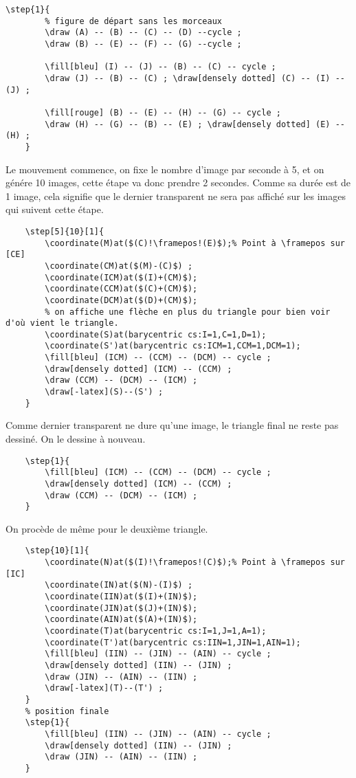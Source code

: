 \documentclass[a4paper,12pt]{article}
\begin{document}
\begin{lstlisting}[name=exemplecomplet]
	\step{1}{
		% figure de départ sans les morceaux
		\draw (A) -- (B) -- (C) -- (D) --cycle ;
		\draw (B) -- (E) -- (F) -- (G) --cycle ;
		
		\fill[bleu] (I) -- (J) -- (B) -- (C) -- cycle ;
		\draw (J) -- (B) -- (C) ; \draw[densely dotted] (C) -- (I) -- (J) ;
			
		\fill[rouge] (B) -- (E) -- (H) -- (G) -- cycle ;
		\draw (H) -- (G) -- (B) -- (E) ; \draw[densely dotted] (E) -- (H) ;
	}
\end{lstlisting}
Le mouvement commence, on fixe le nombre d'image par seconde à 5, et on génére 10 images, cette étape va donc prendre 2 secondes. Comme sa durée est de 1 image, cela signifie 
que le dernier transparent ne sera pas affiché sur les images qui suivent cette étape.
\begin{lstlisting}[name=exemplecomplet]
	% déplacement du premier triangle
	\step[5]{10}[1]{
		\coordinate(M)at($(C)!\framepos!(E)$);% Point à \framepos sur [CE]
		\coordinate(CM)at($(M)-(C)$) ;
		\coordinate(ICM)at($(I)+(CM)$);
		\coordinate(CCM)at($(C)+(CM)$);
		\coordinate(DCM)at($(D)+(CM)$);
		% on affiche une flèche en plus du triangle pour bien voir d'où vient le triangle.
		\coordinate(S)at(barycentric cs:I=1,C=1,D=1);
		\coordinate(S')at(barycentric cs:ICM=1,CCM=1,DCM=1);
		\fill[bleu] (ICM) -- (CCM) -- (DCM) -- cycle ;
		\draw[densely dotted] (ICM) -- (CCM) ;
		\draw (CCM) -- (DCM) -- (ICM) ;
		\draw[-latex](S)--(S') ;
	}
\end{lstlisting}

Comme dernier transparent ne dure qu'une image, le triangle final ne reste pas dessiné. On le dessine à nouveau.

\begin{lstlisting}[name=exemplecomplet]
	% position finale
	\step{1}{
		\fill[bleu] (ICM) -- (CCM) -- (DCM) -- cycle ;
		\draw[densely dotted] (ICM) -- (CCM) ;
		\draw (CCM) -- (DCM) -- (ICM) ;
	}
\end{lstlisting}

On procède de même pour le deuxième triangle.

\begin{lstlisting}[name=exemplecomplet]
	% déplacement du deuxième triangle
	\step{10}[1]{
		\coordinate(N)at($(I)!\framepos!(C)$);% Point à \framepos sur [IC]
		\coordinate(IN)at($(N)-(I)$) ;
		\coordinate(IIN)at($(I)+(IN)$);
		\coordinate(JIN)at($(J)+(IN)$);
		\coordinate(AIN)at($(A)+(IN)$);
		\coordinate(T)at(barycentric cs:I=1,J=1,A=1);
		\coordinate(T')at(barycentric cs:IIN=1,JIN=1,AIN=1);
		\fill[bleu] (IIN) -- (JIN) -- (AIN) -- cycle ;
		\draw[densely dotted] (IIN) -- (JIN) ;
		\draw (JIN) -- (AIN) -- (IIN) ;
		\draw[-latex](T)--(T') ;
	}
	% position finale
	\step{1}{
		\fill[bleu] (IIN) -- (JIN) -- (AIN) -- cycle ;
		\draw[densely dotted] (IIN) -- (JIN) ;
		\draw (JIN) -- (AIN) -- (IIN) ;
	}
\end{lstlisting}
\end{document}
